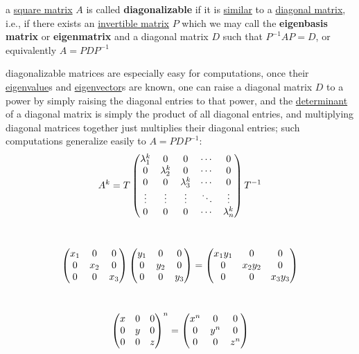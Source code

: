 \documentclass[a4paper,12pt]{article}
\begin{document}
\begin{definition}
a \hyperref[sec:orgf670bc9]{square matrix} \(A\) is called \textbf{diagonalizable} if it is \hyperref[sec:org5ddd44c]{similar} to a \hyperref[sec:orgaf43c3e]{diagonal matrix}, i.e., if there exists an \hyperref[sec:orgb6a6a45]{invertible matrix} \(P\) which we may call the \textbf{eigenbasis matrix} or \textbf{eigenmatrix} and a diagonal matrix \(D\) such that \(P^{-1}AP=D\), or equivalently \(A=PDP^{-1}\)\\
\begin{characteristic}
diagonalizable matrices are especially easy for computations, once their \hyperref[sec:org929d22f]{eigenvalue}s and \hyperref[sec:org929d22f]{eigenvector}s are known, one can raise a diagonal matrix \(D\) to a power by simply raising the diagonal entries to that power, and the \hyperref[sec:orgff9607b]{determinant} of a diagonal matrix is simply the product of all diagonal entries, and multiplying diagonal matrices together just multiplies their diagonal entries; such computations generalize easily to \(A = PDP^{-1}\):\\
\[
  A^k = T \pmqty{\lambda_1^k & 0 & 0 & \cdots & 0\\ 0 & \lambda_2^k & 0 & \cdots & 0\\ 0 & 0 & \lambda_3^k & \cdots & 0\\ \vdots & \vdots & \vdots & \ddots & \vdots\\ 0 & 0 & 0 & \cdots & \lambda_n^k}T^{-1}
\]\\

\begin{my_example}
\[
  \pmqty{x_1 & 0 & 0\\ 0 & x_2 & 0\\ 0 & 0 & x_3}\pmqty{y_1 & 0 & 0\\ 0 & y_2 & 0\\ 0 & 0 & y_3} = \pmqty{x_1y_1 & 0 & 0\\ 0 & x_2y_2 & 0\\ 0 & 0 & x_3y_3}
\]\\
\end{my_example}

\begin{my_example}
\[
  \pmqty{x & 0 & 0\\ 0 & y & 0\\ 0 & 0 & z}^n = \pmqty{x^n & 0 & 0\\ 0 & y^n & 0\\ 0 & 0 & z^n}
\]\\
\end{my_example}


\end{characteristic}
\end{definition}
\end{document}
